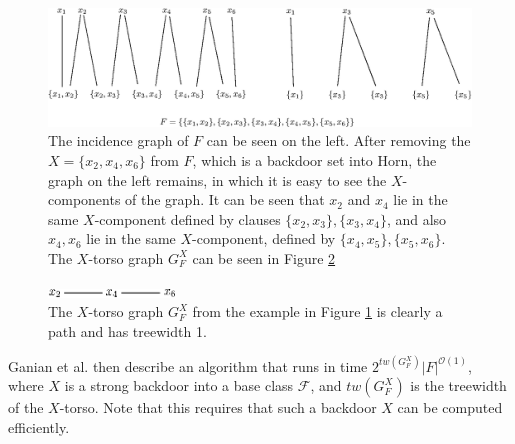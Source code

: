 \documentclass[11pt,a4paper]{article}
\theoremstyle{definition}
\theoremstyle{proposition}
\begin{document}
\begin{figure}[h]
        \centering
        \includegraphics[width=1\textwidth]{figures/backdoortreewidth.eps}
	\caption{The incidence graph of $F$ can be seen on the left. After removing the $X = \{x_2, x_4, x_6\}$ from $F$, which is a backdoor set into Horn, the graph on the left remains, in which it is easy to see the $X$-components of the graph. It can be seen that $x_2$ and $x_4$ lie in the same $X$-component defined by clauses $\{x_2,x_3\}, \{x_3,x_4\}$, and also $x_4, x_6$ lie in the same $X$-component, defined by $\{x_4,x_5\}, \{x_5,x_6\}$. The $X$-torso graph $G_F^X$ can be seen in Figure \ref{fig:backdoortreewidth-2}}
	\label{fig:backdoortreewidth-1}
\end{figure}
\begin{figure}[h]
        \centering
        \includegraphics[width=0.3\textwidth]{figures/backdoortreewidth2.eps}   
	\caption{The $X$-torso graph $G_F^X$ from the example in Figure \ref{fig:backdoortreewidth-1} is clearly a path and has treewidth 1.}
	\label{fig:backdoortreewidth-2}
\end{figure}

Ganian et al. then describe an algorithm that runs in time $2^{tw(G_F^X)}|F|^{\mathcal{O}(1)}$, where $X$ is a strong backdoor into a base class $\mathcal{F}$, and $tw(G_F^X)$ is the treewidth of the $X$-torso{\cite[p.27]{GanianBackdoorTreewidth}}. Note that this requires that such a backdoor $X$ can be computed efficiently. 
\end{document}
